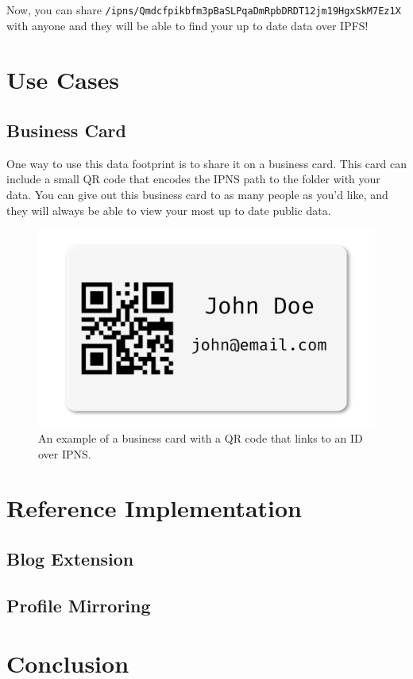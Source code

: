 \documentclass{article}
\begin{document}
Now, you can share \texttt{/ipns/Qmdcfpikbfm3pBaSLPqaDmRpbDRDT12jm19HgxSkM7Ez1X} with anyone and they will be able to find your up to date data over IPFS!



\section{Use Cases}

\subsection{Business Card}

One way to use this data footprint is to share it on a business card. This card can include a small QR code that encodes the IPNS path to the folder with your data. You can give out this business card to as many people as you'd like, and they will always be able to view your most up to date public data. 

\begin{figure}[h]
  \centering
  \includegraphics{resources/business_card.png}
  \caption{An example of a business card with a QR code that links to an ID over IPNS.}
\end{figure}

\section{Reference Implementation}

\subsection{Blog Extension}

\subsection{Profile Mirroring}

\section{Conclusion}
\end{document}
